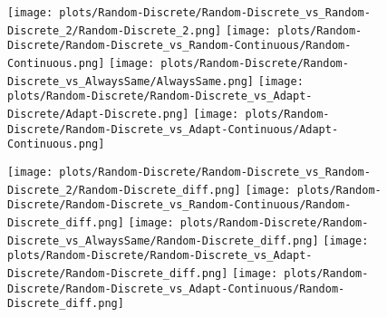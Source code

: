 \documentclass{article}
\begin{document}
\begin{itemize}
\begin{figure}[!h]
	\centering
	\begin{minipage}[c]{0.1\textwidth}
		\raggedleft
	\end{minipage}
	\begin{minipage}[c]{0.80\textwidth}
		\texttt{[image: plots/Random-Discrete/Random-Discrete\_vs\_Random-Discrete\_2/Random-Discrete\_2.png]}\hfill
		\texttt{[image: plots/Random-Discrete/Random-Discrete\_vs\_Random-Continuous/Random-Continuous.png]}\hfill
		\texttt{[image: plots/Random-Discrete/Random-Discrete\_vs\_AlwaysSame/AlwaysSame.png]}\hfill
		\texttt{[image: plots/Random-Discrete/Random-Discrete\_vs\_Adapt-Discrete/Adapt-Discrete.png]}\hfill
		\texttt{[image: plots/Random-Discrete/Random-Discrete\_vs\_Adapt-Continuous/Adapt-Continuous.png]}\hfill
\end{minipage}
\end{figure}
\begin{figure}[!h]
	\centering
	\begin{minipage}[c]{0.1\textwidth}
		\raggedleft
	\end{minipage}
	\begin{minipage}[c]{0.80\textwidth}
		\texttt{[image: plots/Random-Discrete/Random-Discrete\_vs\_Random-Discrete\_2/Random-Discrete\_diff.png]}\hfill
		\texttt{[image: plots/Random-Discrete/Random-Discrete\_vs\_Random-Continuous/Random-Discrete\_diff.png]}\hfill
		\texttt{[image: plots/Random-Discrete/Random-Discrete\_vs\_AlwaysSame/Random-Discrete\_diff.png]}\hfill
		\texttt{[image: plots/Random-Discrete/Random-Discrete\_vs\_Adapt-Discrete/Random-Discrete\_diff.png]}\hfill
		\texttt{[image: plots/Random-Discrete/Random-Discrete\_vs\_Adapt-Continuous/Random-Discrete\_diff.png]}\hfill
\end{minipage}
\end{figure}
\begin{figure}[!h]
	\centering
	\begin{minipage}[c]{0.1\textwidth}
		\raggedleft
	\end{minipage}

\end{figure}
\end{itemize}
\end{document}
